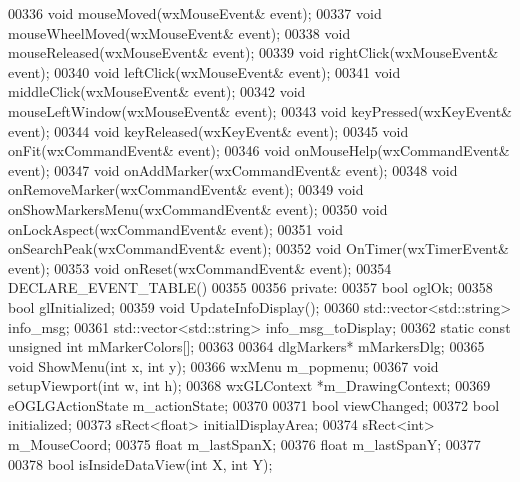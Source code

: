 \begin{DoxyCode}
00336     \textcolor{keywordtype}{void} mouseMoved(wxMouseEvent& event);
00337     \textcolor{keywordtype}{void} mouseWheelMoved(wxMouseEvent& event);
00338     \textcolor{keywordtype}{void} mouseReleased(wxMouseEvent& event);
00339     \textcolor{keywordtype}{void} rightClick(wxMouseEvent& event);
00340     \textcolor{keywordtype}{void} leftClick(wxMouseEvent& event);
00341     \textcolor{keywordtype}{void} middleClick(wxMouseEvent& event);
00342     \textcolor{keywordtype}{void} mouseLeftWindow(wxMouseEvent& event);
00343     \textcolor{keywordtype}{void} keyPressed(wxKeyEvent& event);
00344     \textcolor{keywordtype}{void} keyReleased(wxKeyEvent& event);
00345     \textcolor{keywordtype}{void} onFit(wxCommandEvent& event);
00346     \textcolor{keywordtype}{void} onMouseHelp(wxCommandEvent& event);
00347     \textcolor{keywordtype}{void} onAddMarker(wxCommandEvent& event);
00348     \textcolor{keywordtype}{void} onRemoveMarker(wxCommandEvent& event);
00349     \textcolor{keywordtype}{void} onShowMarkersMenu(wxCommandEvent& event);
00350     \textcolor{keywordtype}{void} onLockAspect(wxCommandEvent& event);
00351     \textcolor{keywordtype}{void} onSearchPeak(wxCommandEvent& event);
00352     \textcolor{keywordtype}{void} OnTimer(wxTimerEvent& event);
00353     \textcolor{keywordtype}{void} onReset(wxCommandEvent& event);
00354     DECLARE\_EVENT\_TABLE()
00355 
00356 private:
00357     \textcolor{keywordtype}{bool} oglOk;
00358     \textcolor{keywordtype}{bool} glInitialized;
00359     \textcolor{keywordtype}{void} UpdateInfoDisplay();
00360     std::vector<std::\textcolor{keywordtype}{string}> info\_msg;
00361     std::vector<std::\textcolor{keywordtype}{string}> info\_msg\_toDisplay;
00362     static const \textcolor{keywordtype}{unsigned} \textcolor{keywordtype}{int} mMarkerColors[];
00363 
00364     dlgMarkers* mMarkersDlg;
00365     \textcolor{keywordtype}{void} ShowMenu(\textcolor{keywordtype}{int} x, \textcolor{keywordtype}{int} y);
00366     wxMenu m\_popmenu;
00367     \textcolor{keywordtype}{void} setupViewport(\textcolor{keywordtype}{int} w, \textcolor{keywordtype}{int} h);
00368     wxGLContext *m\_DrawingContext;
00369     eOGLGActionState m\_actionState;
00370 
00371     \textcolor{keywordtype}{bool} viewChanged;
00372     \textcolor{keywordtype}{bool} initialized;
00373     sRect<\textcolor{keywordtype}{float}> initialDisplayArea;
00374     sRect<\textcolor{keywordtype}{int}> m\_MouseCoord;
00375     \textcolor{keywordtype}{float} m\_lastSpanX;
00376     \textcolor{keywordtype}{float} m\_lastSpanY;
00377 
00378     \textcolor{keywordtype}{bool} isInsideDataView(\textcolor{keywordtype}{int} X, \textcolor{keywordtype}{int} Y);

\end{DoxyCode}
